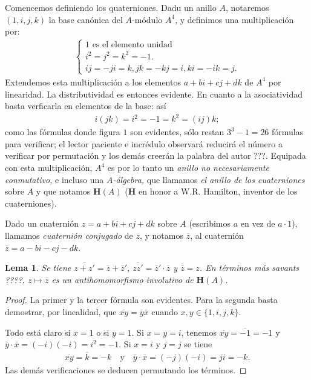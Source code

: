 \documentclass[10pt,oneside,bibtotoc,smallheadings,leqno,a5paper,DIV=12]{scrbook}
\newcommand{\HH}{\mathbf{H}}
\newcommand{\QED}{}%
\newcommand{\oline}[1]{\overline{#1}}
\numberwithin{equation}{section}
\theoremstyle{defi}
\theoremstyle{enonce}
\newtheorem{lemma}{Lema}
\theoremstyle{rem}
\numberwithin{theorem}{section}
\numberwithin{proposition}{section}
\numberwithin{definition}{section}
\numberwithin{lemma}{section}
\numberwithin{corollary}{section}
\numberwithin{example}{section}
\numberwithin{footnote}{section}%
\begin{document}
Comencemos definiendo los quaterniones. Dadu un anillo $A$, notaremos $(1,i,j,k)$ la base can\'onica del
$A$-m\'odulo $A^{4}$, y definimos una multiplicaci\'on por:
\begin{gather}\label{eq-5.7-1}
\begin{cases}
\text{$1$ es el elemento unidad}\\
\text{$i^{2}=j^{2}=k^{2}=-1$.}\\
\text{$ij=-ji=k, jk=-kj=i, ki=-ik=j$.}
\end{cases}
\end{gather}
Extendemos esta multiplicaci\'on a los elementos $a+bi+cj+dk$ de $A^{4}$ por linearidad. La distributividad
es entonces evidente. En cuanto a la asociatividad basta verficarla en elementos de la base: as\'i
\begin{gather*}
i(jk) = i^{2} = -1 = k^{2} = (ij)k;
\end{gather*}
como las f\'ormulas donde figura $1$ son evidentes, s\'olo restan $3^{3}-1=26$ f\'ormulas para verificar;
el lector paciente e incr\'edulo observar\'a reducir\'a el n\'umero a verificar por permutaci\'on y los
dem\'as creer\'an la palabra del autor ???. Equipada con esta multiplicaci\'on, $A^{4}$ es por lo tanto
un {\em anillo no necesariamente conmutativo,} e incluso una {\em $A$-\'algebra,} que llamamos
{\em el anillo de los cuaterniones} sobre $A$ y que notamos $\HH(A)$ ($\HH$ en honor a W.R. Hamilton, inventor
de los cuaterniones).

Dado un cuaterni\'on $z = a+bi+cj+dk$ sobre $A$ (escribimos $a$ en vez de $a\cdot 1$), llamamos
{\em cuaterni\'on conjugado} de $z$, y notamos $\oline z$, al cuaterni\'on $\oline z = a-bi-cj-dk$.

\begin{lemma}
Se tiene $\oline{z+z'} = \oline z+\oline z'$, $\oline{zz'} = \oline z'\cdot\oline z$ y
$\oline{\oline z}=z$. En t\'erminos m\'as savants ????, $z\mapsto\oline z$ es un antihomomorfismo involutivo
de $\HH(A)$.
\end{lemma}

\begin{proof}
La primer y la tercer f\'ormula son evidentes. Para la segunda basta demostrar, por linealidad,
que $\oline{xy} = \oline{y}\oline x$ cuando $x,y\in\{1,i,j,k\}$.

Todo est\'a claro si $x=1$ o si $y=1$. Si $x=y=i$, tenemos $\oline{xy} = \oline{-1}=-1$ y
$\oline y\cdot\oline x = (-i)(-i) = i^{2}=-1$. Si $x=i$ y $j=j$ se tiene
\begin{gather*}
\oline{xy} = \oline k = -k\quad\text{y}\quad\oline y\cdot\oline x = (-j)(-i) = ji = -k.
\end{gather*}
Las dem\'as verificaciones se deducen permutando los t\'erminos. \QED
\end{proof}
\end{document}
